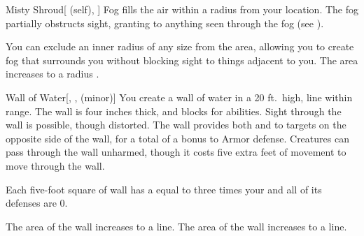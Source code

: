 \lowercase{\hypertarget{spell:Misty Shroud}{}}\label{spell:Misty Shroud}
\begin{attuneability}[Rank 4]{\hypertarget{spell:Misty Shroud}{Misty Shroud}}[ (self), ]
\targetrule
Fog fills the air within a \areamed radius  from your location.
The fog partially obstructs sight, granting  to anything seen through the fog (see ).

\rankline
{} You can exclude an inner radius of any size from the area, allowing you to create fog that surrounds you without blocking sight to things adjacent to you.
 The area increases to a \arealarge radius .
\end{attuneability}
\vspace{0.25em}



\lowercase{\hypertarget{spell:Wall of Water}{}}\label{spell:Wall of Water}
\begin{freeability}[Rank 4]{\hypertarget{spell:Wall of Water}{Wall of Water}}[, ,  (minor)]
\targetrule
You create a wall of water in a 20 ft.\ high, \arealarge line within \rngmed range.
The wall is four inches thick, and blocks  for abilities.
Sight through the wall is possible, though distorted.
The wall provides both  and  to targets on the opposite side of the wall, for a total of a  bonus to Armor defense.
Creatures can pass through the wall unharmed, though it costs five extra feet of movement to move through the wall.

Each five-foot square of wall has a  equal to three times your  and all of its defenses are 0.

\rankline
{} The area of the wall increases to a \areahuge line.
 The area of the wall increases to a \areaext line.
\end{freeability}
\vspace{0.25em}



